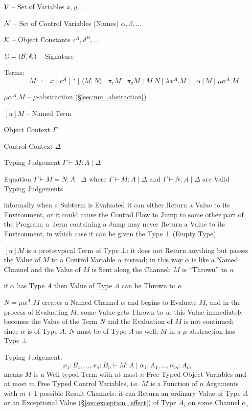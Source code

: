 $\mathcal{V}$ -- Set of Variables $x,y,\ldots$

$\mathcal{N}$ -- Set of Control Variables (Names) $\alpha,\beta,\ldots$

$\mathcal{K}$ -- Object Constants $c^A,d^B,\ldots$

$\Sigma = (\mathcal{B},\mathcal{K})$ -- Signature

Terms:
\[
  \quad\quad M ::= x \mid c^A \mid * \mid \langle M,N \rangle
    \mid \pi_1 M \mid \pi_2 M \mid M\;N \mid \lambda x^A.M
    \mid [\alpha]M \mid \mu\alpha^A.M
\]

$\mu\alpha^A.M$ -- $\mu$-abstraction (\S\ref{sec:mu_abstraction})

$[\alpha]M$ -- Named Term

Object Context $\Gamma$

Control Context $\Delta$

Typing Judgement $\Gamma \vdash M:A \mid \Delta$

Equation $\Gamma \vdash M = N : A \mid \Delta$ where $\Gamma \vdash M
: A \mid \Delta$ and $\Gamma \vdash N : A \mid \Delta$ are Valid
Typing Judgements


\asterism


informally when a Subterm is Evaluated it can either Return a Value to
its Environment, or it could cause the Control Flow to Jump to some
other part of the Program; a Term containing a Jump may never Return a
Value to its Environment, in which case it can be given the Type
$\bot$ (Empty Type)

$[\alpha]M$ is a prototypical Term of Type $\bot$: it does not Return
anything but passes the Value of $M$ to a Control Variable $\alpha$
instead; in this way $\alpha$ is like a Named Channel and the Value of
$M$ is Sent along the Channel; $M$ is ``Thrown'' to $\alpha$

if $\alpha$ has Type $A$ then Value of Type $A$ can be Thrown to
$\alpha$

$N = \mu\alpha^A.M$ creates a Named Channel $\alpha$ and begins to
Evaluate $M$, and in the process of Evaluating $M$, some Value gets
Thrown to $\alpha$, this Value immediately becomes the Value of the
Term $N$ and the Evaluation of $M$ is not continued; since $\alpha$ is
of Type $A$, $N$ must be of Type $A$ as well; $M$ in a
$\mu$-abstraction has Type $\bot$

Typing Judgement:
\[
  x_1:B_1, \ldots, x_n:B_n \vdash M:A \mid \alpha_1:A_1, \ldots, \alpha_m:A_m
\]
means $M$ is a Well-typed Term with at most $n$ Free Typed Object
Variables and at most $m$ Free Typed Control Variables, i.e. $M$ is a
Function of $n$ Arguments with $m + 1$ possible Result Channels: it
can Return an ordinary Value of Type $A$ or an Exceptional Value
(\S\ref{sec:exception_effect}) of Type $A_i$ on some Channel
$\alpha_i$

